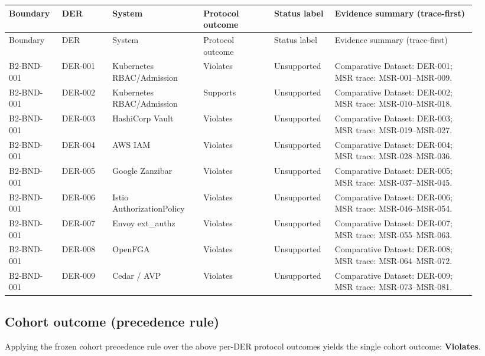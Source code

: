 \begin{center}
\begin{longtable}{@{}p{0.10\linewidth}p{0.10\linewidth}p{0.18\linewidth}p{0.14\linewidth}p{0.12\linewidth}p{0.28\linewidth}@{}}
\toprule
Boundary & DER & System & Protocol outcome & Status label & Evidence summary (trace-first) \\
\midrule
\endfirsthead
\toprule
Boundary & DER & System & Protocol outcome & Status label & Evidence summary (trace-first) \\
\midrule
\endhead
\bottomrule
\endfoot
\bottomrule
\endlastfoot
B2-BND-001 & DER-001 & Kubernetes RBAC/Admission & Violates & Unsupported & Comparative Dataset: DER-001; MSR trace: MSR-001--MSR-009. \\
B2-BND-001 & DER-002 & Kubernetes RBAC/Admission & Supports & Unsupported & Comparative Dataset: DER-002; MSR trace: MSR-010--MSR-018. \\
B2-BND-001 & DER-003 & HashiCorp Vault & Violates & Unsupported & Comparative Dataset: DER-003; MSR trace: MSR-019--MSR-027. \\
B2-BND-001 & DER-004 & AWS IAM & Violates & Unsupported & Comparative Dataset: DER-004; MSR trace: MSR-028--MSR-036. \\
B2-BND-001 & DER-005 & Google Zanzibar & Violates & Unsupported & Comparative Dataset: DER-005; MSR trace: MSR-037--MSR-045. \\
B2-BND-001 & DER-006 & Istio AuthorizationPolicy & Violates & Unsupported & Comparative Dataset: DER-006; MSR trace: MSR-046--MSR-054. \\
B2-BND-001 & DER-007 & Envoy ext\_authz & Violates & Unsupported & Comparative Dataset: DER-007; MSR trace: MSR-055--MSR-063. \\
B2-BND-001 & DER-008 & OpenFGA & Violates & Unsupported & Comparative Dataset: DER-008; MSR trace: MSR-064--MSR-072. \\
B2-BND-001 & DER-009 & Cedar / AVP & Violates & Unsupported & Comparative Dataset: DER-009; MSR trace: MSR-073--MSR-081. \\
\end{longtable}
\end{center}

\subsection{Cohort outcome (precedence rule)}
Applying the frozen cohort precedence rule over the above per-DER protocol outcomes yields the single cohort outcome: \textbf{Violates}.

